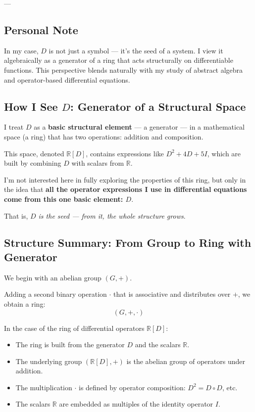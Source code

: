 \documentclass[12pt]{article}
\begin{document}
---

\subsection*{Personal Note}

In my case, $D$ is not just a symbol — it's the seed of a system. I view it algebraically as a generator of a ring that acts structurally on differentiable functions. This perspective blends naturally with my study of abstract algebra and operator-based differential equations.

\subsection*{How I See \boldmath$D$: Generator of a Structural Space}

I treat $D$ as a \textbf{basic structural element} — a generator — in a mathematical space (a ring) that has two operations: addition and composition.

This space, denoted $\mathbb{R}[D]$, contains expressions like $D^2 + 4D + 5I$, which are built by combining $D$ with scalars from $\mathbb{R}$.

I'm not interested here in fully exploring the properties of this ring, but only in the idea that \textbf{all the operator expressions I use in differential equations come from this one basic element: $D$}.

That is, \emph{$D$ is the seed — from it, the whole structure grows}.

\subsection*{Structure Summary: From Group to Ring with Generator}

We begin with an abelian group $(G, +)$.

Adding a second binary operation $\cdot$ that is associative and distributes over $+$, we obtain a ring:
\[
(G, +, \cdot)
\]

In the case of the ring of differential operators $\mathbb{R}[D]$:
\begin{itemize}
	\item The ring is built from the generator $D$ and the scalars $\mathbb{R}$.
	\item The underlying group $(\mathbb{R}[D], +)$ is the abelian group of operators under addition.
	\item The multiplication $\cdot$ is defined by operator composition: $D^2 = D \circ D$, etc.
	\item The scalars $\mathbb{R}$ are embedded as multiples of the identity operator $I$.
\end{itemize}
\end{document}
